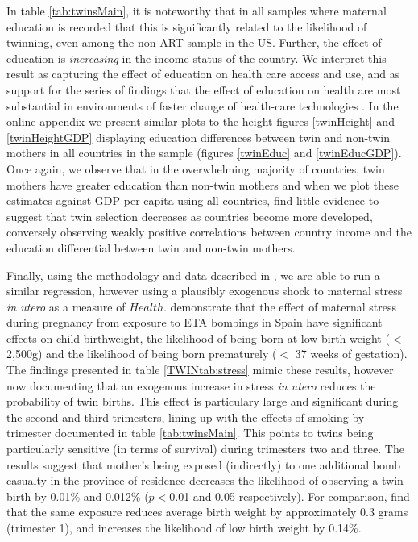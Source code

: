 \documentclass[subeqn]{article}
\begin{document}
\begin{spacing}{1.4}
In table \ref{tab:twinsMain}, it is noteworthy that in all samples where
maternal education is recorded that this is significantly related to the
likelihood of twinning, even among the non-ART sample in the US. Further,
the effect of education is \emph{increasing} in the income status of the
country.  We interpret this result as capturing the effect of education on
health care access and use, and as support for the series of findings that
the effect of education on health are most substantial in environments of
faster change of health-care technologies \citep{LlerasMuney2005,
  CutlerLlerasMuney2010}.  In the online appendix we present similar plots
to the height figures \ref{twinHeight} and \ref{twinHeightGDP} displaying
education differences between twin and non-twin mothers in all countries in
the sample (figures \ref{twinEduc} and \ref{twinEducGDP}).  Once again, we
observe that in the overwhelming majority of countries, twin mothers have
greater education than non-twin mothers and when we plot these estimates
against GDP per capita using all countries, find little evidence to suggest
that twin selection decreases as countries become more developed, conversely
observing weakly positive correlations between country income and the
education differential between twin and non-twin mothers.

Finally, using the methodology and data described in \citet{QuintanaRodenas2014},
we are able to run a similar regression, however using a plausibly exogenous
shock to maternal stress \emph{in utero} as a measure of $Health$.
\citet{QuintanaRodenas2014} demonstrate that the effect of maternal stress during
pregnancy from exposure to ETA bombings in Spain have significant effects on
child birthweight, the likelihood of being born at low birth weight ($<$ 2,500g)
and the likelihood of being born prematurely ($<$ 37 weeks of gestation).  The
findings presented in table \ref{TWINtab:stress} mimic these results, however
now documenting that an exogenous increase in stress \emph{in utero} reduces the
probability of twin births. This effect is particulary large and significant
during the second and third trimesters, lining up with the effects of smoking by
trimester documented in table \ref{tab:twinsMain}.  This points to twins being
particularly sensitive (in terms of survival) during trimesters two and three.
The results suggest that mother's being exposed (indirectly) to one additional
bomb casualty in the province of residence decreases the likelihood of observing
a twin birth by 0.01\% and 0.012\% ($p<$0.01 and 0.05 respectively). For
comparison, \citet{QuintanaRodenas2014} find that the same exposure reduces
average birth weight by approximately 0.3 grams (trimester 1), and increases
the likelihood of low birth weight by 0.14\%.



\end{spacing}
\end{document}
